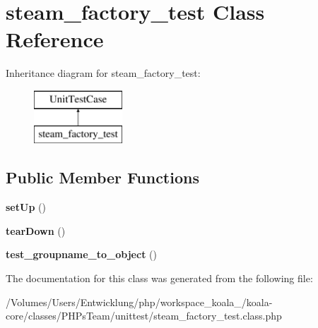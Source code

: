 \hypertarget{classsteam__factory__test}{
\section{steam\_\-factory\_\-test Class Reference}
\label{classsteam__factory__test}
}
Inheritance diagram for steam\_\-factory\_\-test:\begin{figure}[H]
\begin{center}
\leavevmode
\includegraphics[height=2.000000cm]{classsteam__factory__test}
\end{center}
\end{figure}
\subsection*{Public Member Functions}
\begin{DoxyCompactItemize}
\item 
\hypertarget{classsteam__factory__test_a11066038ec0d35d74760f1c3646a39cb}{
{\bfseries setUp} ()}
\label{classsteam__factory__test_a11066038ec0d35d74760f1c3646a39cb}

\item 
\hypertarget{classsteam__factory__test_afbb343c43fd6f6505dfa06c875b0fe67}{
{\bfseries tearDown} ()}
\label{classsteam__factory__test_afbb343c43fd6f6505dfa06c875b0fe67}

\item 
\hypertarget{classsteam__factory__test_ae86d989fbc447fce40e48d3841953906}{
{\bfseries test\_\-groupname\_\-to\_\-object} ()}
\label{classsteam__factory__test_ae86d989fbc447fce40e48d3841953906}

\end{DoxyCompactItemize}


The documentation for this class was generated from the following file:\begin{DoxyCompactItemize}
\item 
/Volumes/Users/Entwicklung/php/workspace\_\-koala\_/koala-\/core/classes/PHPsTeam/unittest/steam\_\-factory\_\-test.class.php\end{DoxyCompactItemize}
